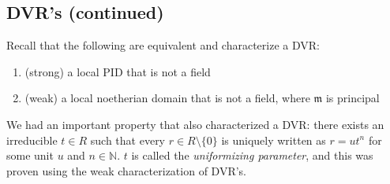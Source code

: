\documentclass[12pt]{article}
\newcommand{\n}{\mathbb{N}}
\newcommand{\ita}[1]{\textit{#1}}
\theoremstyle{definition}
\begin{document}
\subsection{DVR's (continued)}
Recall that the following are equivalent and characterize a DVR:
\begin{enumerate}
    \item (strong) a local PID that is not a field
    \item (weak) a local noetherian domain that is not a field, where $\mathfrak{m}$ is principal
\end{enumerate}
We had an important property that also characterized a DVR: there exists an irreducible $t\in R$ such that every $r\in R\setminus\{0\}$ is uniquely written as $r=ut^n$ for some unit $u$ and $n\in\n$. $t$ is called the \ita{uniformizing parameter}, and this was proven using the weak characterization of DVR's.
\end{document}
